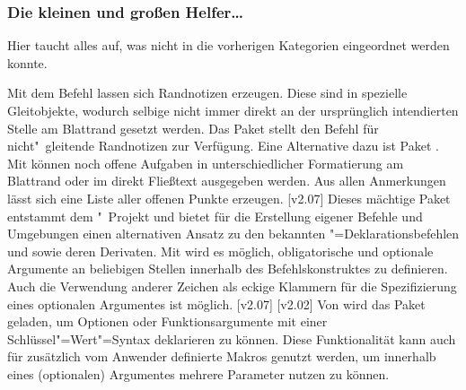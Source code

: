 \subsubsection{Die kleinen und großen Helfer\dots}
%
Hier taucht alles auf, was nicht in die vorherigen Kategorien eingeordnet 
werden konnte.

\begin{DeclarePackages}
  Mit dem Befehl  lassen sich Randnotizen erzeugen. Diese sind 
  in  spezielle Gleitobjekte, wodurch selbige nicht immer direkt 
  an der ursprünglich intendierten Stelle am Blattrand gesetzt werden. Das 
  Paket  stellt den Befehl  für 
  nicht"~gleitende Randnotizen zur Verfügung. Eine Alternative dazu ist Paket 
  .
  Mit  können noch offene Aufgaben in unterschiedlicher 
  Formatierung am Blattrand oder im direkt Fließtext ausgegeben werden. Aus 
  allen Anmerkungen lässt sich eine Liste aller offenen Punkte erzeugen.
  [v2.07]
  Dieses mächtige Paket entstammt dem "~Projekt und bietet für 
  die Erstellung eigener Befehle und Umgebungen einen alternativen Ansatz zu 
  den bekannten "=Deklarationsbefehlen  und 
   sowie deren Derivaten. Mit  wird es 
  möglich, obligatorische und optionale Argumente an beliebigen Stellen 
  innerhalb des Befehlskonstruktes zu definieren. Auch die Verwendung anderer 
  Zeichen als eckige Klammern für die Spezifizierung eines optionalen 
  Argumentes ist möglich.
  [v2.07]
[v2.02]
  Von  wird das Paket  geladen, um Optionen 
  oder Funktionsargumente mit einer Schlüssel"=Wert"=Syntax deklarieren zu 
  können. Diese Funktionalität kann auch für zusätzlich vom Anwender definierte 
  Makros genutzt werden, um innerhalb eines (optionalen) Argumentes mehrere 
  Parameter nutzen zu können.
  

\end{DeclarePackages}
